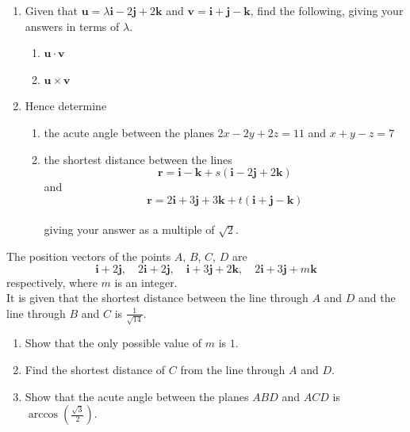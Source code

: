 \documentclass[leqno]{article}
\begin{document}
\begin{enumerate}[
  label=\textbf{\arabic*.},
  leftmargin=*,
  topsep=0pt,
  partopsep=0pt,
  parsep=0pt
]
\begin{enumerate}[label=\textbf{(\alph*)}]
  \item Given that $\mathbf{u}=\lambda\mathbf{i}-2\mathbf{j}+2\mathbf{k}$ and $\mathbf{v}=\mathbf{i}+\mathbf{j}-\mathbf{k}$, find the following, giving your answers in terms of $\lambda$. 
  \begin{enumerate}[label=(\roman*)]
    \item $\mathbf{u}\cdot\mathbf{v}$ 
    \item $\mathbf{u}\times\mathbf{v}$  \\
  \end{enumerate}
  \item Hence determine
  \begin{enumerate}[label=(\roman*)]
    \item the acute angle between the planes $2x-2y+2z=11$ and $x+y-z=7$ 
    \item the shortest distance between the lines
    \[
    \mathbf{r}=\mathbf{i}-\mathbf{k}+s(\mathbf{i}-2\mathbf{j}+2\mathbf{k})
    \] 
    and
    \[
    \mathbf{r}=2\mathbf{i}+3\mathbf{j}+3\mathbf{k}+t(\mathbf{i}+\mathbf{j}-\mathbf{k})
    \]\\
    giving your answer as a multiple of $\sqrt{2}$. 
  \end{enumerate}
\end{enumerate}

\newpage

\questionitem

The position vectors of the points $A$, $B$, $C$, $D$ are
\[
\mathbf{i}+2\mathbf{j},\quad 2\mathbf{i}+2\mathbf{j},\quad \mathbf{i}+3\mathbf{j}+2\mathbf{k},\quad 2\mathbf{i}+3\mathbf{j}+m\mathbf{k}
\]
respectively, where $m$ is an integer. \\

It is given that the shortest distance between the line through $A$ and $D$ and the line through $B$ and $C$ is $\tfrac{1}{\sqrt{14}}$. \\
\begin{enumerate}[label=\textbf{(\alph*)}]
  \item Show that the only possible value of $m$ is $1$.  \\
  \item Find the shortest distance of $C$ from the line through $A$ and $D$.  \\
  \item Show that the acute angle between the planes $ABD$ and $ACD$ is $\arccos\left(\frac{\sqrt{3}}{2}\right)$.  \\
\end{enumerate}
\end{enumerate}
\end{document}
